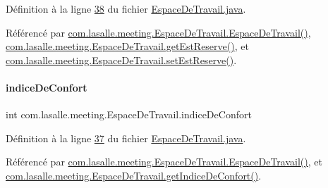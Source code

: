 Définition à la ligne \hyperlink{_espace_de_travail_8java_source_l00038}{38} du fichier \hyperlink{_espace_de_travail_8java_source}{Espace\+De\+Travail.\+java}.



Référencé par \hyperlink{_espace_de_travail_8java_source_l00070}{com.\+lasalle.\+meeting.\+Espace\+De\+Travail.\+Espace\+De\+Travail()}, \hyperlink{_espace_de_travail_8java_source_l00117}{com.\+lasalle.\+meeting.\+Espace\+De\+Travail.\+get\+Est\+Reserve()}, et \hyperlink{_espace_de_travail_8java_source_l00122}{com.\+lasalle.\+meeting.\+Espace\+De\+Travail.\+set\+Est\+Reserve()}.

\mbox{\label{classcom_1_1lasalle_1_1meeting_1_1_espace_de_travail_a6a75c9c45ccb98895e02a1864bf4a41d}} 
\paragraph{\texorpdfstring{indice\+De\+Confort}{indiceDeConfort}}
{\footnotesize\ttfamily int com.\+lasalle.\+meeting.\+Espace\+De\+Travail.\+indice\+De\+Confort\hspace{0.3cm}{\ttfamily [private]}}



Définition à la ligne \hyperlink{_espace_de_travail_8java_source_l00037}{37} du fichier \hyperlink{_espace_de_travail_8java_source}{Espace\+De\+Travail.\+java}.



Référencé par \hyperlink{_espace_de_travail_8java_source_l00070}{com.\+lasalle.\+meeting.\+Espace\+De\+Travail.\+Espace\+De\+Travail()}, et \hyperlink{_espace_de_travail_8java_source_l00112}{com.\+lasalle.\+meeting.\+Espace\+De\+Travail.\+get\+Indice\+De\+Confort()}.

\mbox{\label{classcom_1_1lasalle_1_1meeting_1_1_espace_de_travail_a375f1e6b0d3590706d863f6dbd86dd11}} 
